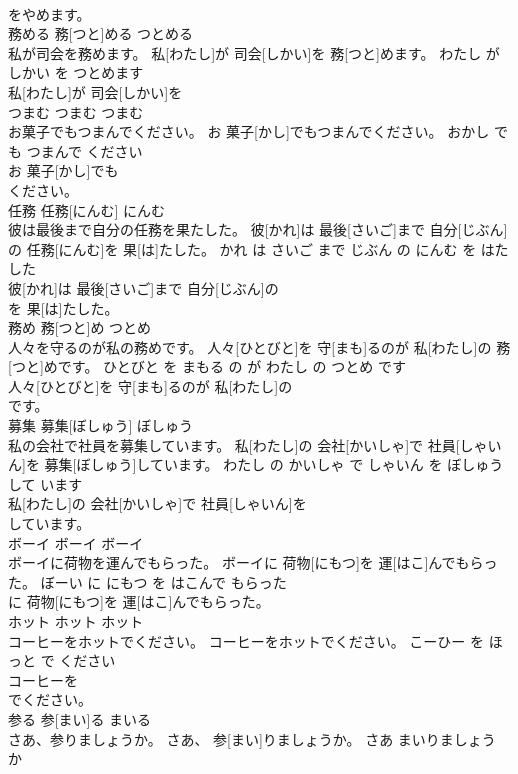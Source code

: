 \documentclass[8pt]{extreport}
\begin{document}
\begin{CJK}{UTF8}{min}
\\	をやめます。			
\\	務める	務[つと]める	つとめる	
\\	私が司会を務めます。	私[わたし]が 司会[しかい]を 務[つと]めます。	わたし が しかい を つとめます	
\\	私[わたし]が 司会[しかい]を
\\	つまむ	つまむ	つまむ	
\\	お菓子でもつまんでください。	お 菓子[かし]でもつまんでください。	おかし で も つまんで ください	
\\	お 菓子[かし]でも
\\	ください。			
\\	任務	任務[にんむ]	にんむ	
\\	彼は最後まで自分の任務を果たした。	彼[かれ]は 最後[さいご]まで 自分[じぶん]の 任務[にんむ]を 果[は]たした。	かれ は さいご まで じぶん の にんむ を はたした	
\\	彼[かれ]は 最後[さいご]まで 自分[じぶん]の
\\	を 果[は]たした。			
\\	務め	務[つと]め	つとめ	
\\	人々を守るのが私の務めです。	人々[ひとびと]を 守[まも]るのが 私[わたし]の 務[つと]めです。	ひとびと を まもる の が わたし の つとめ です	
\\	人々[ひとびと]を 守[まも]るのが 私[わたし]の
\\	です。			
\\	募集	募集[ぼしゅう]	ぼしゅう	
\\	私の会社で社員を募集しています。	私[わたし]の 会社[かいしゃ]で 社員[しゃいん]を 募集[ぼしゅう]しています。	わたし の かいしゃ で しゃいん を ぼしゅう して います	
\\	私[わたし]の 会社[かいしゃ]で 社員[しゃいん]を
\\	しています。			
\\	ボーイ	ボーイ	ボーイ	
\\	ボーイに荷物を運んでもらった。	ボーイに 荷物[にもつ]を 運[はこ]んでもらった。	ぼーい に にもつ を はこんで もらった	
\\	に 荷物[にもつ]を 運[はこ]んでもらった。			
\\	ホット	ホット	ホット	
\\	コーヒーをホットでください。	コーヒーをホットでください。	こーひー を ほっと で ください	
\\	コーヒーを
\\	でください。			
\\	参る	参[まい]る	まいる	
\\	さあ、参りましょうか。	さあ、 参[まい]りましょうか。	さあ まいりましょう か	

\end{CJK}
\end{document}
